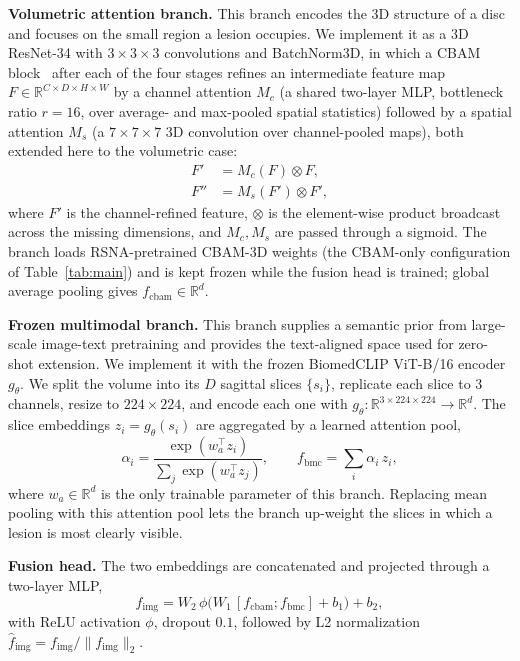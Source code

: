 \documentclass[runningheads]{llncs}
\begin{document}
\textbf{Volumetric attention branch.}
This branch encodes the 3D structure of a disc and focuses on the small region a lesion occupies. We implement it as a 3D ResNet-34 with $3 \times 3 \times 3$ convolutions and BatchNorm3D, in which a CBAM block~\cite{woo2018cbam} after each of the four stages refines an intermediate feature map $F \in \mathbb{R}^{C \times D \times H \times W}$ by a channel attention $M_c$ (a shared two-layer MLP, bottleneck ratio $r=16$, over average- and max-pooled spatial statistics) followed by a spatial attention $M_s$ (a $7\!\times\!7\!\times\!7$ 3D convolution over channel-pooled maps), both extended here to the volumetric case:
\begin{align}
F' &= M_c(F) \otimes F, \label{eq:cbam_c}\\
F'' &= M_s(F') \otimes F', \label{eq:cbam_s}
\end{align}
where $F'$ is the channel-refined feature, $\otimes$ is the element-wise product broadcast across the missing dimensions, and $M_c, M_s$ are passed through a sigmoid. The branch loads RSNA-pretrained CBAM-3D weights (the CBAM-only configuration of Table~\ref{tab:main}) and is kept frozen while the fusion head is trained; global average pooling gives $f_{\text{cbam}} \in \mathbb{R}^{d}$.

\textbf{Frozen multimodal branch.}
This branch supplies a semantic prior from large-scale image-text pretraining and provides the text-aligned space used for zero-shot extension. We implement it with the frozen BiomedCLIP ViT-B/16 encoder $g_\theta$. We split the volume into its $D$ sagittal slices $\{s_i\}$, replicate each slice to 3 channels, resize to $224 \times 224$, and encode each one with $g_\theta : \mathbb{R}^{3 \times 224 \times 224} \to \mathbb{R}^{d}$. The slice embeddings $z_i = g_\theta(s_i)$ are aggregated by a learned attention pool,
\begin{equation}
\alpha_i = \frac{\exp(w_a^\top z_i)}{\sum_{j} \exp(w_a^\top z_j)},
\qquad
f_{\text{bmc}} = \sum_{i} \alpha_i \, z_i,
\label{eq:slicepool}
\end{equation}
where $w_a \in \mathbb{R}^{d}$ is the only trainable parameter of this branch. Replacing mean pooling with this attention pool lets the branch up-weight the slices in which a lesion is most clearly visible.

\textbf{Fusion head.}
The two embeddings are concatenated and projected through a two-layer MLP,
\begin{equation}
f_{\text{img}} = W_2\,\phi\!\big(W_1\,[f_{\text{cbam}};f_{\text{bmc}}] + b_1\big) + b_2,
\label{eq:fusion}
\end{equation}
with ReLU activation $\phi$, dropout $0.1$, followed by L2 normalization $\hat{f}_{\text{img}} = f_{\text{img}} / \|f_{\text{img}}\|_2$.
\end{document}
